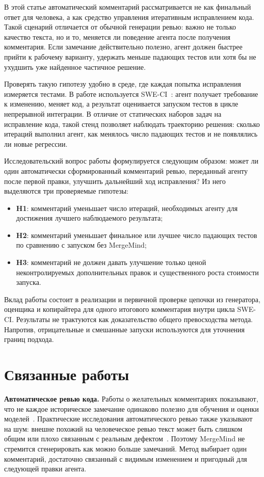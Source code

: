 \documentclass[12pt,a4paper]{article}
\begin{document}
В этой статье автоматический комментарий рассматривается не как финальный ответ
для человека, а как средство управления итеративным исправлением кода. Такой
сценарий отличается от обычной генерации ревью: важно не только качество текста,
но и то, меняется ли поведение агента после получения комментария. Если
замечание действительно полезно, агент должен быстрее прийти к рабочему
варианту, удержать меньше падающих тестов или хотя бы не ухудшить уже найденное
частичное решение.

Проверять такую гипотезу удобно в среде, где каждая попытка исправления
измеряется тестами. В работе используется SWE-CI~\cite{sweci}: агент получает
требование к изменению, меняет код, а результат оценивается запуском тестов в
цикле непрерывной интеграции. В отличие от статических наборов задач на
исправление кода, такой стенд позволяет наблюдать траекторию решения: сколько
итераций выполнил агент, как менялось число падающих тестов и не появлялись ли
новые регрессии.

Исследовательский вопрос работы формулируется следующим образом: может ли один
автоматически сформированный комментарий ревью, переданный агенту после первой
правки, улучшить дальнейший ход исправления? Из него выделяются три проверяемые
гипотезы:

\begin{itemize}
  \item \textbf{H1}: комментарий уменьшает число итераций, необходимых агенту
  для достижения лучшего наблюдаемого результата;
  \item \textbf{H2}: комментарий уменьшает финальное или лучшее число падающих
  тестов по сравнению с запуском без MergeMind;
  \item \textbf{H3}: комментарий не должен давать улучшение только ценой
  неконтролируемых дополнительных правок и существенного роста стоимости
  запуска.
\end{itemize}

Вклад работы состоит в реализации и первичной проверке цепочки из генератора,
оценщика и копирайтера для одного итогового комментария внутри цикла SWE-CI.
Результаты не трактуются как доказательство общего превосходства метода.
Напротив, отрицательные и смешанные запуски используются для уточнения границ
подхода.

\section{Связанные работы}

\textbf{Автоматическое ревью кода.}
Работы о желательных комментариях показывают, что не каждое историческое
замечание одинаково полезно для обучения и оценки моделей~\cite{desiview}.
Практические исследования автоматического ревью также указывают на шум: внешне
похожий на человеческое ревью текст может быть слишком общим или плохо связанным
с реальным дефектом~\cite{acrpractice}. Поэтому MergeMind не стремится
сгенерировать как можно больше замечаний. Метод выбирает один комментарий,
достаточно связанный с видимым изменением и пригодный для следующей правки
агента.
\end{document}
